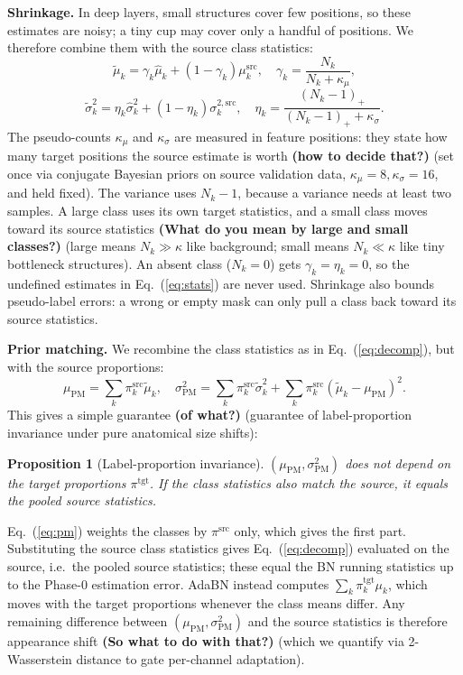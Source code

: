 \documentclass{article}
\newtheorem{proposition}{Proposition}
\newcommand{\src}{\mathrm{src}}
\newcommand{\PM}{\mathrm{PM}}
\begin{document}
\textbf{Shrinkage.} In deep layers, small structures cover few positions, so these estimates are noisy; a tiny cup may cover only a handful of positions. We therefore combine them with the source class statistics:
\begin{equation}
\tilde\mu_k=\gamma_k\hat\mu_k+(1-\gamma_k)\mu^{\src}_k,\quad
\gamma_k=\frac{N_k}{N_k+\kappa_\mu},
\label{eq:shrinkmu}
\end{equation}
\begin{equation}
\tilde\sigma^2_k=\eta_k\hat\sigma^2_k+(1-\eta_k)\sigma^{2,\src}_k,\quad
\eta_k=\frac{(N_k-1)_+}{(N_k-1)_+ +\kappa_\sigma}.
\label{eq:shrinkvar}
\end{equation}
The pseudo-counts $\kappa_\mu$ and $\kappa_\sigma$ are measured in feature positions: they state how many target positions the source estimate is worth \textbf{(how to decide that?)} (set once via conjugate Bayesian priors on source validation data, $\kappa_\mu=8, \kappa_\sigma=16$, and held fixed). The variance uses $N_k-1$, because a variance needs at least two samples. A large class uses its own target statistics, and a small class moves toward its source statistics \textbf{(What do you mean by large and small classes?)} (large means $N_k \gg \kappa$ like background; small means $N_k \ll \kappa$ like tiny bottleneck structures). An absent class ($N_k=0$) gets $\gamma_k=\eta_k=0$, so the undefined estimates in Eq.~(\ref{eq:stats}) are never used. Shrinkage also bounds pseudo-label errors: a wrong or empty mask can only pull a class back toward its source statistics.

\textbf{Prior matching.} We recombine the class statistics as in Eq.~(\ref{eq:decomp}), but with the source proportions:
\begin{equation}
\mu_{\PM}=\sum_k\pi^{\src}_k\tilde\mu_k,\quad
\sigma^2_{\PM}=\sum_k\pi^{\src}_k\tilde\sigma^2_k
+\sum_k\pi^{\src}_k(\tilde\mu_k-\mu_{\PM})^2 .
\label{eq:pm}
\end{equation}
This gives a simple guarantee \textbf{(of what?)} (guarantee of label-proportion invariance under pure anatomical size shifts):

\begin{proposition}[Label-proportion invariance]\label{prop:inv} $(\mu_{\PM},\sigma^2_{\PM})$ does not depend on the target proportions $\pi^{\mathrm{tgt}}$. If the class statistics also match the source, it equals the pooled source statistics.
\end{proposition}

Eq.~(\ref{eq:pm}) weights the classes by $\pi^{\src}$ only, which gives the first part. Substituting the source class statistics gives Eq.~(\ref{eq:decomp}) evaluated on the source, i.e.\ the pooled source statistics; these equal the BN running statistics up to the Phase-0 estimation error. AdaBN instead computes $\sum_k\pi^{\mathrm{tgt}}_k\mu_k$, which moves with the target proportions whenever the class means differ. Any remaining difference between $(\mu_{\PM},\sigma^2_{\PM})$ and the source statistics is therefore appearance shift \textbf{(So what to do with that?)} (which we quantify via 2-Wasserstein distance to gate per-channel adaptation).
\end{document}
